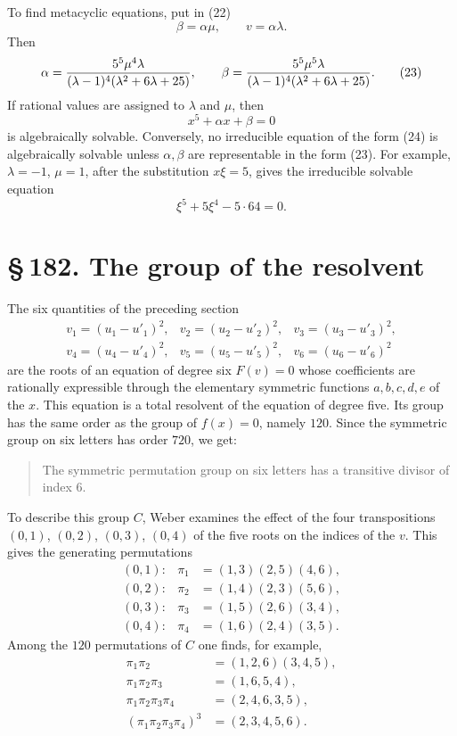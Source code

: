 \documentclass[11pt]{article}
\newcommand{\sect}[2]{\section*{\S\,#1. #2}}
\begin{document}
To find metacyclic equations, put in (22)
\[
  \beta=\alpha\mu,
  \qquad v=\alpha\lambda.
\]
Then
\[
  \alpha={5^5\mu^4\lambda\over(\lambda-1)^4(\lambda^2+6\lambda+25)},
  \qquad
  \beta={5^5\mu^5\lambda\over(\lambda-1)^4(\lambda^2+6\lambda+25)}. \tag{23}
\]
If rational values are assigned to $\lambda$ and $\mu$, then
\[
  x^5+\alpha x+
\beta=0                                                     \tag{24}
\]
is algebraically solvable. Conversely, no irreducible equation of the form (24) is algebraically solvable unless $\alpha,
\beta$ are representable in the form (23). For example, $\lambda=-1$, $\mu=1$, after the substitution $x\xi=5$, gives the irreducible solvable equation
\[
  \xi^5+5\xi^4-5\cdot64=0.
\]

\sect{182}{The group of the resolvent}

The six quantities of the preceding section
\[
\begin{array}{lll}
 v_1=(u_1-u'_1)^2,& v_2=(u_2-u'_2)^2,& v_3=(u_3-u'_3)^2,\\
 v_4=(u_4-u'_4)^2,& v_5=(u_5-u'_5)^2,& v_6=(u_6-u'_6)^2
\end{array}                                                       \tag{1}
\]
are the roots of an equation of degree six $F(v)=0$ whose coefficients are rationally expressible through the elementary symmetric functions $a,b,c,d,e$ of the $x$. This equation is a total resolvent of the equation of degree five. Its group has the same order as the group of $f(x)=0$, namely $120$. Since the symmetric group on six letters has order $720$, we get:
\begin{quote}
The symmetric permutation group on six letters has a transitive divisor of index $6$.
\end{quote}

To describe this group $C$, Weber examines the effect of the four transpositions $(0,1)$, $(0,2)$, $(0,3)$, $(0,4)$ of the five roots on the indices of the $v$. This gives the generating permutations
\[
\begin{array}{rcl}
(0,1):&\pi_1&=(1,3)(2,5)(4,6),\\
(0,2):&\pi_2&=(1,4)(2,3)(5,6),\\
(0,3):&\pi_3&=(1,5)(2,6)(3,4),\\
(0,4):&\pi_4&=(1,6)(2,4)(3,5).
\end{array}
\]
Among the $120$ permutations of $C$ one finds, for example,
\[
\begin{aligned}
\pi_1\pi_2&=(1,2,6)(3,4,5),\\
\pi_1\pi_2\pi_3&=(1,6,5,4),\\
\pi_1\pi_2\pi_3\pi_4&=(2,4,6,3,5),\\
(\pi_1\pi_2\pi_3\pi_4)^3&=(2,3,4,5,6).
\end{aligned}
\]
\end{document}
